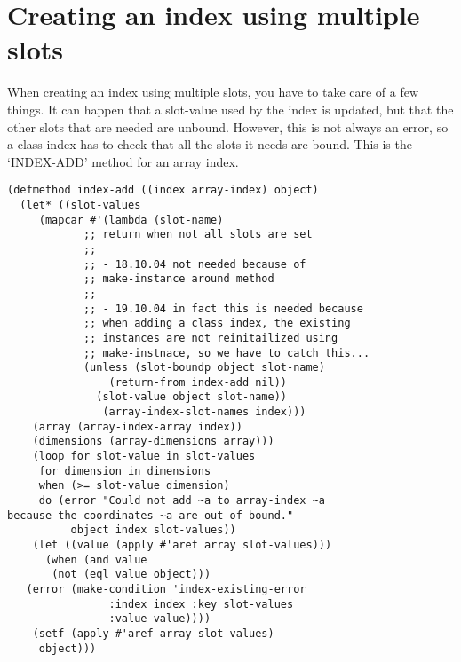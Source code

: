 \section{ Creating an index using multiple slots}

When creating an index using multiple slots, you have to take care
of a few things. It can happen that a slot-value used by the index
is updated, but that the other slots that are needed are
unbound. However, this is not always an error, so a class index
has to check that all the slots it needs are bound. This is the
`INDEX-ADD' method for an array index.

\begin{Verbatim}[fontsize=\small,frame=leftline,framerule=0.9mm,rulecolor=\color{gray},framesep=5.1mm,xleftmargin=5mm,fontfamily=cmtt]
(defmethod index-add ((index array-index) object)
  (let* ((slot-values
     (mapcar #'(lambda (slot-name)
            ;; return when not all slots are set
            ;;
            ;; - 18.10.04 not needed because of
            ;; make-instance around method
            ;;
            ;; - 19.10.04 in fact this is needed because
            ;; when adding a class index, the existing
            ;; instances are not reinitailized using
            ;; make-instnace, so we have to catch this...
            (unless (slot-boundp object slot-name)
                (return-from index-add nil))
              (slot-value object slot-name))
               (array-index-slot-names index)))
    (array (array-index-array index))
    (dimensions (array-dimensions array)))
    (loop for slot-value in slot-values
     for dimension in dimensions
     when (>= slot-value dimension)
     do (error "Could not add ~a to array-index ~a
because the coordinates ~a are out of bound."
          object index slot-values))
    (let ((value (apply #'aref array slot-values)))
      (when (and value
       (not (eql value object)))
   (error (make-condition 'index-existing-error
                :index index :key slot-values
                :value value))))
    (setf (apply #'aref array slot-values)
     object)))
\end{Verbatim}
